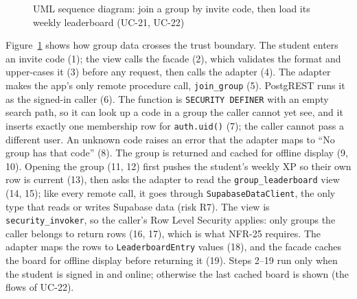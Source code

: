 \documentclass[12pt,letterpaper]{article}
\begin{document}
\begin{figure}[!htbp]
{}
\caption{UML sequence diagram: join a group by invite code, then load its weekly leaderboard (UC-21, UC-22)}
\label{fig:sequence2}
\end{figure}

Figure~\ref{fig:sequence2} shows how group data crosses the trust boundary. The
student enters an invite code (1); the view calls the facade (2), which validates the
format and upper-cases it (3) before any request, then calls the adapter (4). The
adapter makes the app's only remote procedure call, \texttt{join\_group} (5). PostgREST
runs it as the signed-in caller (6). The function is \texttt{SECURITY DEFINER} with an
empty search path, so it can look up a code in a group the caller cannot yet see,
and it inserts exactly one membership row for \texttt{auth.uid()} (7); the caller
cannot pass a different user. An unknown code raises an error that the adapter maps
to ``No group has that code'' (8). The group is returned and cached for offline display
(9, 10). Opening the group (11, 12) first pushes the student's weekly XP so their own
row is current (13), then asks the adapter to read the \texttt{group\_leaderboard} view
(14, 15); like every remote call, it goes through \texttt{SupabaseDataClient}, the only
type that reads or writes Supabase data (risk R7). The view is \texttt{security\_invoker}, so the
caller's Row Level Security applies: only groups the caller belongs to return rows
(16, 17), which is what NFR-25 requires. The adapter maps the rows to
\texttt{LeaderboardEntry} values (18), and the facade caches the board for offline
display before returning it (19). Steps 2--19 run
only when the student is signed in and online; otherwise the last cached board is shown
(the flows of UC-22).
\end{document}
